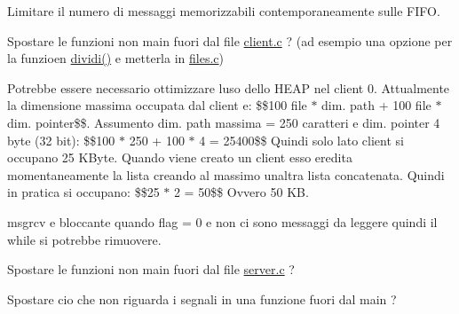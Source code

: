 
\begin{DoxyRefList}
\item[\label{todo__todo000001}%
\Hypertarget{todo__todo000001}%
File \hyperlink{client_8c}{client.c} ]Limitare il numero di messaggi memorizzabili contemporaneamente sulle F\+I\+FO. 

Spostare le funzioni non main fuori dal file \hyperlink{client_8c}{client.\+c} ? (ad esempio una opzione per la funzioen \hyperlink{client_8c_a55586f2b7e9b3620294cf78cda8abdad}{dividi()} e\textquotesingle{} metterla in \hyperlink{files_8c}{files.\+c}) 
\item[\label{todo__todo000002}%
\Hypertarget{todo__todo000002}%
Globale \hyperlink{client_8h_a8c7084a254c7cd640d66e647795ff8f6}{operazioni\+\_\+client0} ()]Potrebbe essere necessario ottimizzare l\textquotesingle{}uso dello H\+E\+AP nel client 0. Attualmente la dimensione massima occupata dal client e\textquotesingle{}\+: \$\$100 file $\ast$ dim. path + 100 file $\ast$ dim. pointer\$\$. Assumento dim. path massima = 250 caratteri e dim. pointer 4 byte (32 bit)\+: \$\$100 $\ast$ 250 + 100 $\ast$ 4 = 25400\$\$ Quindi solo lato client si occupano 25 K\+Byte. Quando viene creato un client esso eredita momentaneamente la lista creando al massimo un\textquotesingle{}altra lista concatenata. Quindi in pratica si occupano\+: \$\$25 $\ast$ 2 = 50\$\$ Ovvero 50 KB.

msgrcv e\textquotesingle{} bloccante quando flag = 0 e non ci sono messaggi da leggere quindi il while si potrebbe rimuovere. 
\item[\label{todo__todo000004}%
\Hypertarget{todo__todo000004}%
File \hyperlink{server_8c}{server.c} ]Spostare le funzioni non main fuori dal file \hyperlink{server_8c}{server.\+c} ? 

Spostare cio\textquotesingle{} che non riguarda i segnali in una funzione fuori dal main ? 
\end{DoxyRefList}